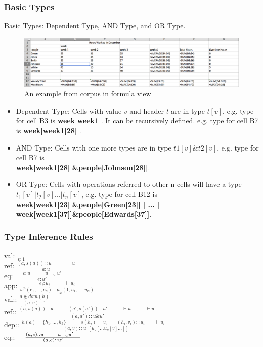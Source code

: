 \documentclass[a4paper]{article}
\begin{document}
\subsubsection{Basic Types}
Basic Types: Dependent Type, AND Type, and OR Type.
\begin{figure}[!tb]
\centering
\includegraphics[width=1\columnwidth]{formula.png}
\caption{An example from corpus in formula view}
\label{sheet}
\end{figure}

\begin{itemize}
\item Dependent Type: Cells with value $v$ and header $t$ are in type $t[v]$, e.g. type for cell B3 is \textbf{week[week1]}. It can be recursively defined. e.g. type for cell B7 is \textbf{week[week1[28]]}. 
\item AND Type: Cells with one more types are in type $t1[v]\&t2[v]$, e.g. type for cell B7 is \\
\textbf{week[week1[28]]\&people[Johnson[28]]}.
\item OR Type: Cells with operations referred to other n cells will have a type $t_1[v]|t_2[v]...|t_n[v]$, e.g. type for cell B12 is \\
\textbf{week[week1[23]]\&people[Green[23]] $|$ ... $|$ week[week1[37]]\&people[Edwards[37]]}.
\end{itemize}

\subsubsection{Type Inference Rules}
val: $ \frac {  }{ v:1 } $\\ ref: $ \frac { (a,s(a))::u\quad \quad \quad \vdash u }{ a:u }$ \\  eq: $ \quad \frac { e:u\quad \quad \quad u{ = }_{ u }u' }{ e:u' }$ \\ app: $ \frac { { e }_{ i }:{ u }_{ i }\quad \quad \quad \vdash { u }_{ i } }{ { \omega  }^{ n }({ e }_{ 1 },\dots ,{ e }_{ n })::{ \mu  }_{ \omega  }(1,{ u }_{ 1 },\dots ,{ u }_{ n }) }$ \\ val:: $ \frac { a\notin dom(h) }{ (a,v)::1 }$ \\ ref:: $ \frac { (a,s(a))::u\quad \quad \quad (a',s(a'))::u'\quad \quad \quad \vdash u\quad \quad \quad \vdash u' }{ (a,a')::u\& u' }$ \\ dep:: $ \frac { h(a)=\{ { h }_{ 1 },\dots ,{ h }_{ k }\} \quad \quad \quad s({ h }_{ i })={ v }_{ i }\quad \quad ({ h }_{ i },{ v }_{ i })::{ { u }_{ i } }\quad \quad \vdash { u }_{ i }\quad  }{ (a,v)::{ u }_{ 1 }[{ u }_{ 2 }[\dots { u }_{ k }[v]\dots ]] }$ \\ eq:: $ \quad \frac { (a,e)::u\quad \quad u{ = }_{ u }u'\quad  }{ (a,e)::u' } \\$ 
\end{document}
